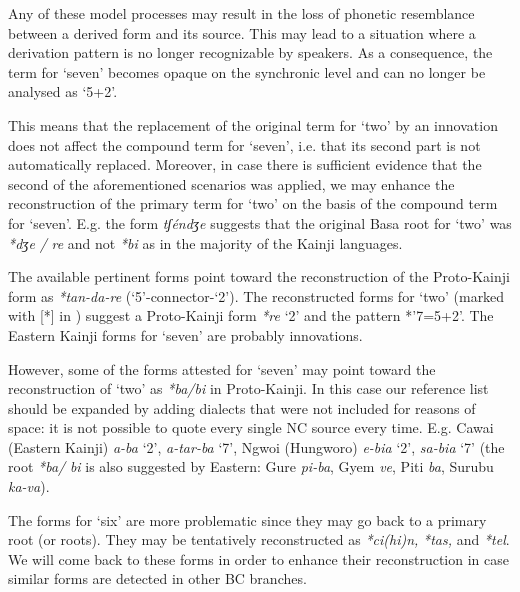 \newpage 
Any of these model processes may result in the loss of phonetic resemblance between a derived form and its source. This may lead to a situation where a derivation pattern is no longer recognizable by speakers. As a consequence, the term for ‘seven’ becomes opaque on the synchronic level and can no longer be analysed as ‘5+2’.

This means that the replacement of the original term for ‘two’ by an innovation does not affect the compound term for ‘seven’, i.e. that its second part is not automatically replaced. Moreover, in case there is sufficient evidence that the second of the aforementioned scenarios was applied, we may enhance the reconstruction of the primary term for ‘two’ on the basis of the compound term for ‘seven’. E.g. the form \textit{tʃéndʒe} suggests that the original Basa root for ‘two’ was \textit{*dʒe} \textit{/} \textit{re} and not \textit{*bi} as in the majority of the Kainji languages.

The available pertinent forms point toward the reconstruction of the Proto-Kainji form as  \textit{*tan-da-re} (‘5’-connector-‘2’). The reconstructed forms for ‘two’ (marked with [*] in ) suggest a Proto-Kainji form \textit{*re} ‘2’ and the pattern *’7=5+2’. The Eastern Kainji forms for ‘seven’ are probably innovations.

However, some of the forms attested for ‘seven’ may point toward the reconstruction of ‘two’ as \textit{*ba/bi} in Proto-Kainji. In this case our reference list should be expanded by adding dialects that were not included for reasons of space: it is not possible to quote every single NC source every time. E.g. Cawai (Eastern Kainji) \textit{a-ba} ‘2’, \textit{a-tar-ba} ‘7’, Ngwoi (Hungworo) \textit{e-bia} ‘2’, \textit{sa-bia} ‘7’ (the root \textit{*ba/} \textit{bi} is also suggested by Eastern: Gure \textit{pi-ba}, Gyem \textit{ve}, Piti \textit{ba}, Surubu \textit{ka-va}).

The forms  for ‘six’ are more problematic since they may go back to a primary root (or roots). They may be tentatively reconstructed as \textit{*ci(hi)n,} \textit{*tas,} and \textit{*tel}. We will come back to these forms in order to enhance their reconstruction in case similar forms are detected in other BC branches. 

